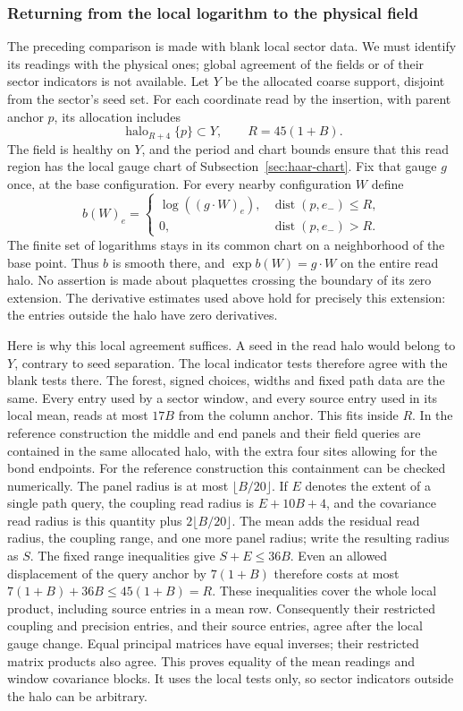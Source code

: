 \subsubsection{Returning from the local logarithm to the physical field}
The preceding comparison is made with blank local sector data.
We must identify its readings with the physical ones; global
agreement of the fields or of their sector indicators is not
available. Let $Y$ be the allocated coarse support, disjoint
from the sector's seed set. For each coordinate read by the
insertion, with parent anchor $p$, its allocation includes
\[
 \operatorname{halo}_{R+4}\{p\}\subset Y,
                    \qquad R=45(1+B).
\]
The field is healthy on $Y$, and the period and chart bounds
ensure that this read region has the local gauge chart of
Subsection~\ref{sec:haar-chart}. Fix that gauge $g$ once, at the
base configuration. For every nearby configuration $W$ define
\[
 b(W)_e=\begin{cases}
 \log((g\cdot W)_e),&\operatorname{dist}(p,e_-)\le R,\\
 0,&\operatorname{dist}(p,e_-)>R.
 \end{cases}
\]
The finite set of logarithms stays in its common chart on a
neighborhood of the base point. Thus $b$ is smooth there, and
$\exp b(W)=g\cdot W$ on the entire read halo. No assertion is
made about plaquettes crossing the boundary of its zero extension.
The derivative estimates used above hold for precisely this
extension: the entries outside the halo have zero derivatives.

Here is why this local agreement suffices. A seed in the read
halo would belong to $Y$, contrary to seed separation. The local
indicator tests therefore agree with the blank tests there.
The forest, signed choices, widths and fixed path data are the
same. Every entry used by a sector window, and every source
entry used in its local mean, reads at most $17B$ from the
column anchor. This fits inside $R$. In the reference construction
the middle and end panels and their field queries are contained
in the same allocated halo, with the extra four sites allowing
for the bond endpoints. For the reference construction this containment can be checked
numerically. The panel radius is at most $\lfloor B/20\rfloor$.
If $E$ denotes the extent of a single path query, the coupling
read radius is $E+10B+4$, and the covariance read radius is this
quantity plus $2\lfloor B/20\rfloor$. The mean adds the residual
read radius, the coupling range, and one more panel radius;
write the resulting radius as $S$. The fixed range inequalities
give $S+E\le36B$. Even an allowed displacement of the query
anchor by $7(1+B)$ therefore costs at most
$7(1+B)+36B\le45(1+B)=R$. These inequalities cover the
whole local product, including source entries in a mean row.
Consequently their restricted coupling
and precision entries, and their source entries, agree after
the local gauge change. Equal principal matrices have equal
inverses; their restricted matrix products also agree. This
proves equality of the mean readings and window covariance
blocks. It uses the local tests only, so sector indicators outside
the halo can be arbitrary.

